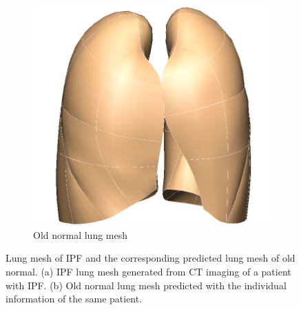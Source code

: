 \begin{figure}[htbp]
\begin{subfigure}{.4\linewidth}%
  \includegraphics[width=\linewidth,trim={{.0\wd0} {.0\wd0} {.0\wd0} {.0\wd0}},clip]{ModelBasedAnalysis/Image/IPF405_NormalLungMesh.png}
  \caption{Old normal lung mesh}
  \label{fig:LungShapePrediction-b} 
\end{subfigure}
\caption{Lung mesh of IPF and the corresponding predicted lung mesh of old normal. (a) IPF lung mesh generated from CT imaging of a patient with IPF. (b) Old normal lung mesh predicted with the individual information of the same patient.}
\label{fig:LungShapePrediction}
\end{figure}


